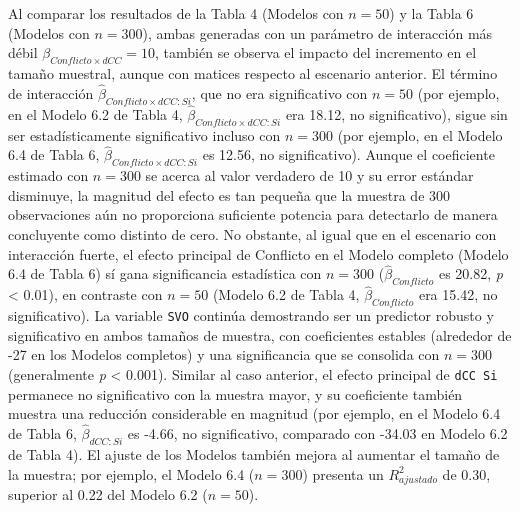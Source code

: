 \documentclass[
  spanish,
  10pt,
]{article}
\begin{document}
Al comparar los resultados de la Tabla 4 (Modelos con \(n=50\)) y la
Tabla 6 (Modelos con \(n=300\)), ambas generadas con un parámetro de
interacción más débil \(\beta_{Conflicto \times dCC}=10\), también se
observa el impacto del incremento en el tamaño muestral, aunque con
matices respecto al escenario anterior. El término de interacción
\(\hat\beta_{Conflicto \times dCC:Si}\), que no era significativo con
\(n=50\) (por ejemplo, en el Modelo 6.2 de Tabla 4,
\(\hat{\beta}_{Conflicto \times dCC:Si}\) era 18.12, no significativo),
sigue sin ser estadísticamente significativo incluso con \(n=300\) (por
ejemplo, en el Modelo 6.4 de Tabla 6,
\(\hat{\beta}_{Conflicto \times dCC:Si}\) es 12.56, no significativo).
Aunque el coeficiente estimado con \(n=300\) se acerca al valor
verdadero de 10 y su error estándar disminuye, la magnitud del efecto es
tan pequeña que la muestra de 300 observaciones aún no proporciona
suficiente potencia para detectarlo de manera concluyente como distinto
de cero. No obstante, al igual que en el escenario con interacción
fuerte, el efecto principal de Conflicto en el Modelo completo (Modelo
6.4 de Tabla 6) sí gana significancia estadística con \(n=300\)
(\(\hat{\beta}_{Conflicto}\) es 20.82, \emph{p} \textless{} 0.01), en
contraste con \(n=50\) (Modelo 6.2 de Tabla 4,
\(\hat{\beta}_{Conflicto}\) era 15.42, no significativo). La variable
\texttt{SVO} continúa demostrando ser un predictor robusto y
significativo en ambos tamaños de muestra, con coeficientes estables
(alrededor de -27 en los Modelos completos) y una significancia que se
consolida con \(n=300\) (generalmente \emph{p} \textless{} 0.001).
Similar al caso anterior, el efecto principal de \texttt{dCC\ Si}
permanece no significativo con la muestra mayor, y su coeficiente
también muestra una reducción considerable en magnitud (por ejemplo, en
el Modelo 6.4 de Tabla 6, \(\hat{\beta}_{dCC:Si}\) es -4.66, no
significativo, comparado con -34.03 en Modelo 6.2 de Tabla 4). El ajuste
de los Modelos también mejora al aumentar el tamaño de la muestra; por
ejemplo, el Modelo 6.4 (\(n=300\)) presenta un \(R^2_{ajustado}\) de
0.30, superior al 0.22 del Modelo 6.2 (\(n=50\)).
\end{document}
